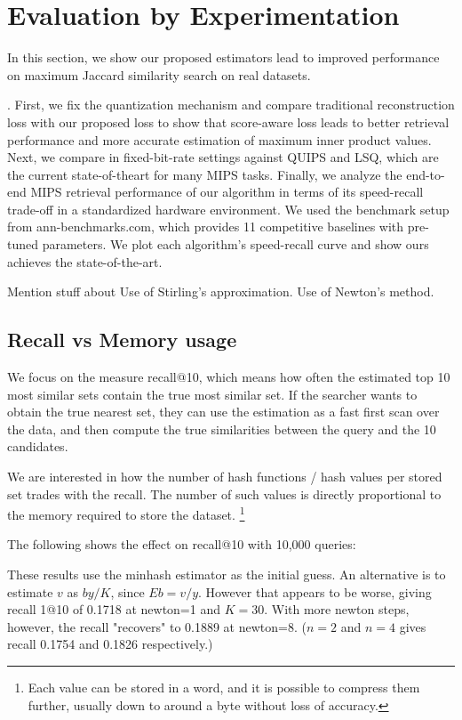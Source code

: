
\section{Evaluation by Experimentation}

In this section, we show our proposed estimators lead to improved performance on maximum
Jaccard similarity search on real datasets.

. First, we fix the quantization
mechanism and compare traditional reconstruction
loss with our proposed loss to show that score-aware
loss leads to better retrieval performance and more accurate estimation of maximum inner product values.
Next, we compare in fixed-bit-rate settings against
QUIPS and LSQ, which are the current state-of-theart for many MIPS tasks. Finally, we analyze the
end-to-end MIPS retrieval performance of our algorithm in terms of its speed-recall trade-off in a
standardized hardware environment. We used the
benchmark setup from ann-benchmarks.com, which
provides 11 competitive baselines with pre-tuned parameters. We plot each algorithm’s speed-recall curve
and show ours achieves the state-of-the-art.

Mention stuff about
Use of Stirling's approximation.
Use of Newton's method.

\subsection{Recall vs Memory usage}

We focus on the measure recall@10, which means how often the estimated top 10 most similar sets contain the true most similar set.
If the searcher wants to obtain the true nearest set, they can use the estimation as a fast first scan over the data, and then compute the true similarities between the query and the 10 candidates.

We are interested in how the number of hash functions / hash values per stored set trades with the recall.
The number of such values is directly proportional to the memory required to store the dataset.
\footnote{Each value can be stored in a word, and it is possible to compress them further, usually down to around a byte without loss of accuracy.}

The following shows the effect on recall@10 with 10,000 queries:

These results use the minhash estimator as the initial guess.
An alternative is to estimate $v$ as $by/K$, since $Eb=v/y$.
However that appears to be worse, giving recall 1@10 of 0.1718 at newton=1 and $K=30$.
With more newton steps, however, the recall "recovers" to 0.1889 at newton=8.
($n=2$ and $n=4$ gives recall 0.1754 and 0.1826 respectively.)

